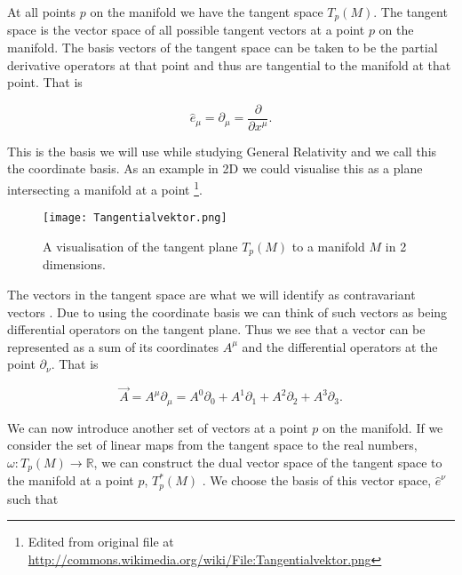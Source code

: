At all points \(p\) on the manifold we have the tangent space \(T_p (M)\). The tangent space is the vector space of all possible tangent vectors at a point \(p\) on the manifold. The basis vectors of the tangent space can be taken to be the partial derivative operators at that point and thus are tangential to the manifold at that point. That is

\begin{equation} \label{coordinate-basis}
	\hat{e}_{\mu} = \partial_{\mu} = \frac{\partial}{\partial x^{\mu}} .
\end{equation}

This is the basis we will use while studying General Relativity and we call this the coordinate basis. As an example in 2D we could visualise this as a plane intersecting a manifold at a point \footnote{Edited from original file at \url{http://commons.wikimedia.org/wiki/File:Tangentialvektor.png}}.


%

\begin{figure}[h!]
	\centering
	\texttt{[image: Tangentialvektor.png]}
	\caption{A visualisation of the tangent plane $T_{p} (M)$ to a manifold $M$ in 2 dimensions.}
\end{figure}

The vectors in the tangent space are what we will identify as contravariant vectors \cite{hartle, carroll}. Due to using the coordinate basis we can think of such vectors as being differential operators on the tangent plane. Thus we see that a vector can be represented as a sum of its coordinates \(A^{\mu}\) and the differential operators at the point \(\partial_{\nu}\). That is

\begin{equation} \label{contravariant}
	\vec{A} = A^{\mu} \partial_{\mu} = A^{0} \partial_{0} + A^{1} \partial_{1} + A^{2} \partial_{2} + A^{3} \partial_{3} .
\end{equation} 

We can now introduce another set of vectors at a point \(p\) on the manifold. If we consider the set of linear maps from the tangent space to the real numbers, \(\omega : T_{p} (M) \rightarrow \mathbb{R}\), we can construct the dual vector space of the tangent space to the manifold at a point \(p\), \(T_{p}^{*} (M)\) \cite{carroll}. We choose the basis of this vector space, \(\hat{e}^{\nu}\) such that \cite{carroll, hartle} 

